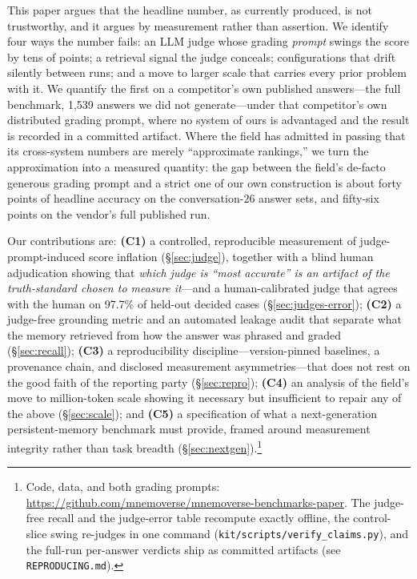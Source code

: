 \documentclass[11pt]{article}
\begin{document}
This paper argues that the headline number, as currently produced, is not trustworthy, and it argues by measurement rather than assertion. We identify four ways the number fails: an LLM judge whose grading \emph{prompt} swings the score by tens of points; a retrieval signal the judge conceals; configurations that drift silently between runs; and a move to larger scale that carries every prior problem with it. We quantify the first on a competitor's own published answers---the full benchmark, 1{,}539 answers we did not generate---under that competitor's own distributed grading prompt, where no system of ours is advantaged and the result is recorded in a committed artifact. Where the field has admitted in passing that its cross-system numbers are merely ``approximate rankings,'' we turn the approximation into a measured quantity: the gap between the field's de-facto generous grading prompt and a strict one of our own construction is about forty points of headline accuracy on the conversation-26 answer sets, and fifty-six points on the vendor's full published run.

Our contributions are: \textbf{(C1)} a controlled, reproducible measurement of judge-prompt-induced score inflation (\S\ref{sec:judge}), together with a blind human adjudication showing that \emph{which judge is ``most accurate'' is an artifact of the truth-standard chosen to measure it}---and a human-calibrated judge that agrees with the human on 97.7\% of held-out decided cases (\S\ref{sec:judges-error}); \textbf{(C2)} a judge-free grounding metric and an automated leakage audit that separate what the memory retrieved from how the answer was phrased and graded (\S\ref{sec:recall}); \textbf{(C3)} a reproducibility discipline---version-pinned baselines, a provenance chain, and disclosed measurement asymmetries---that does not rest on the good faith of the reporting party (\S\ref{sec:repro}); \textbf{(C4)} an analysis of the field's move to million-token scale showing it necessary but insufficient to repair any of the above (\S\ref{sec:scale}); and \textbf{(C5)} a specification of what a next-generation persistent-memory benchmark must provide, framed around measurement integrity rather than task breadth (\S\ref{sec:nextgen}).\footnote{Code, data, and both grading prompts: \url{https://github.com/mnemoverse/mnemoverse-benchmarks-paper}. The judge-free recall and the judge-error table recompute exactly offline, the control-slice swing re-judges in one command (\texttt{kit/scripts/verify\_claims.py}), and the full-run per-answer verdicts ship as committed artifacts (see \texttt{REPRODUCING.md}).}
\end{document}
